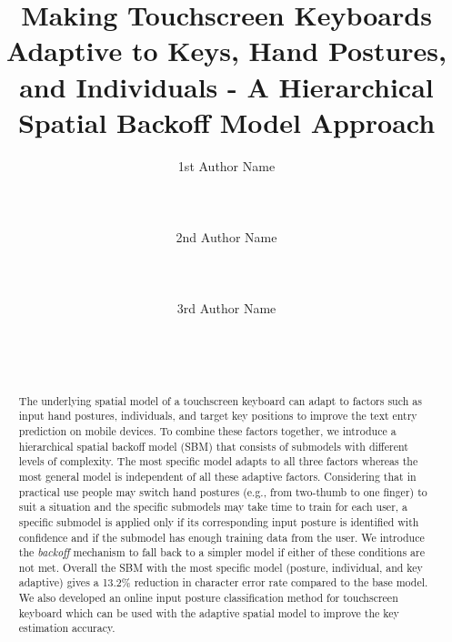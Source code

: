 \documentclass{sigchi}
\begin{document}
\title{Making Touchscreen Keyboards Adaptive to Keys, Hand Postures,  and Individuals - A Hierarchical Spatial Backoff Model Approach}

\author{
  \alignauthor 1st Author Name\\
    \\
    \\
    \\
  \alignauthor 2nd Author Name\\
    \\
    \\
    \\
  \alignauthor 3rd Author Name\\
    \\
    \\
    \\
}


\maketitle

\begin{abstract}
The underlying spatial model of a touchscreen keyboard can adapt to factors such as input hand postures, individuals, and target key positions to improve the text entry prediction on mobile devices. To 
combine these factors together, we introduce a hierarchical spatial backoff
model (SBM) that consists of submodels with different levels of
complexity. The most specific model adapts to 
all three factors whereas the most general model is independent
of all these adaptive factors. Considering that in practical use people may switch hand postures (e.g., from two-thumb to one finger) to suit a situation and the specific submodels may take time to train for each user,  a specific submodel is applied only if its corresponding input posture is identified with confidence and if the submodel has enough training data from the user.  We introduce
the \textit{backoff} mechanism to fall back to a simpler model if either of these conditions are not met. Overall the SBM with the most specific model (posture, individual, and key adaptive) gives a 13.2\% reduction in character error rate compared to the base model. We also
developed an online input posture classification method for touchscreen keyboard which can be
used with the adaptive spatial model to improve the key estimation accuracy.
 
\end{abstract}
\end{document}
